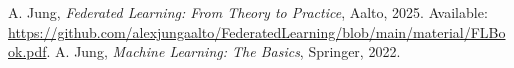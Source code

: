 \documentclass[9pt]{article}
\begin{document}
	\begin{thebibliography}{9}
		 A. Jung, \textit{Federated Learning: From Theory to Practice}, Aalto, 2025. Available: \url{https://github.com/alexjungaalto/FederatedLearning/blob/main/material/FLBook.pdf}.
		 A. Jung, \textit{Machine Learning: The Basics}, Springer, 2022.
	\end{thebibliography}
	
\end{document}
